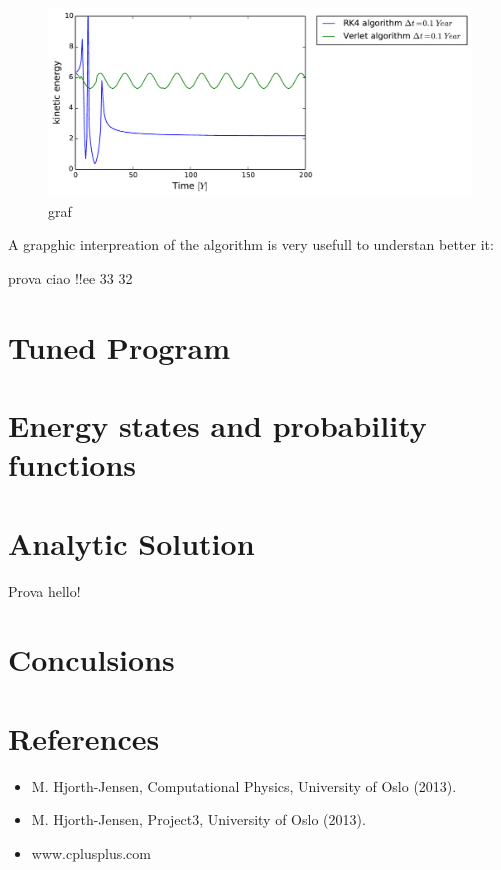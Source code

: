 \documentclass[a4paper]{article}
\begin{document}
 \begin{figure}[H]
\includegraphics[width=1.02\textwidth]{outvel.pdf}
\caption{graf}
\end{figure}


A grapghic interpreation of the algorithm is very usefull to understan better it:

prova ciao !!ee 33
32
\section{Tuned Program}
\section{Energy states and probability functions}\label{2electrons}

\pagebreak
\section{Analytic Solution}
Prova hello!
\pagebreak
\section{Conculsions}

\section{References}
\begin{itemize}
\item M. Hjorth-Jensen, 
Computational Physics, University of Oslo (2013).
\item M. Hjorth-Jensen, 
Project3, University of Oslo (2013).
\item www.cplusplus.com
\end{itemize}
\end{document}
